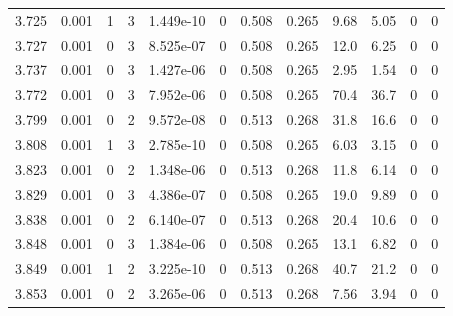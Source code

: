 \documentclass[preview]{standalone}
\begin{document}
{{{{{{{{{\begin{tabular}{L{1.2cm}C{1.2cm} C{0.3cm}C{0.5cm} C{1.4cm}C{1.4cm} C{1.4cm}C{1.4cm} C{1.6cm}C{1.6cm} C{1.6cm}C{1.6cm}}
  3.725  &  0.001  & 1     &  3 &  1.449e-10  & 0  &  0.508&   0.265& 9.68 & 5.05   &  0 & 0  \\ 
  3.727  &  0.001  & 0     &  3 &  8.525e-07  & 0  &  0.508&   0.265& 12.0 & 6.25   &  0 & 0  \\ 
  3.737  &  0.001  & 0     &  3 &  1.427e-06  & 0  &  0.508&   0.265& 2.95 & 1.54   &  0 & 0  \\ 
  3.772  &  0.001  & 0     &  3 &  7.952e-06  & 0  &  0.508&   0.265& 70.4 & 36.7   &  0 & 0  \\ 
  3.799  &  0.001  & 0     &  2 &  9.572e-08  & 0  &  0.513&   0.268& 31.8 & 16.6   &  0 & 0  \\ 
  3.808  &  0.001  & 1     &  3 &  2.785e-10  & 0  &  0.508&   0.265& 6.03 & 3.15   &  0 & 0  \\ 
  3.823  &  0.001  & 0     &  2 &  1.348e-06  & 0  &  0.513&   0.268& 11.8 & 6.14   &  0 & 0  \\ 
  3.829  &  0.001  & 0     &  3 &  4.386e-07  & 0  &  0.508&   0.265& 19.0 & 9.89   &  0 & 0  \\ 
  3.838  &  0.001  & 0     &  2 &  6.140e-07  & 0  &  0.513&   0.268& 20.4 & 10.6   &  0 & 0  \\ 
  3.848  &  0.001  & 0     &  3 &  1.384e-06  & 0  &  0.508&   0.265& 13.1 & 6.82   &  0 & 0  \\ 
  3.849  &  0.001  & 1     &  2 &  3.225e-10  & 0  &  0.513&   0.268& 40.7 & 21.2   &  0 & 0  \\ 
  3.853  &  0.001  & 0     &  2 &  3.265e-06  & 0  &  0.513&   0.268& 7.56 & 3.94   &  0 & 0  \\ 
\hline 
\end{tabular} 

}}}}}}}}}
\end{document}
